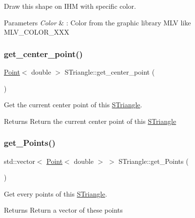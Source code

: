 Draw this shape on I\+HM with specific color. 


\begin{DoxyParams}{Parameters}
{\em Color} & \+: Color from the graphic library M\+LV like M\+L\+V\+\_\+\+C\+O\+L\+O\+R\+\_\+\+X\+XX \\
\hline
\end{DoxyParams}
\mbox{\label{classSTriangle_a61228a7f80ee90de80dff8c4e046f51f}} 
\subsubsection{\texorpdfstring{get\+\_\+center\+\_\+point()}{get\_center\_point()}}
{\footnotesize\ttfamily \hyperlink{classPoint}{Point}$<$ double $>$ S\+Triangle\+::get\+\_\+center\+\_\+point (\begin{DoxyParamCaption}{ }\end{DoxyParamCaption})}



Get the current center point of this \hyperlink{classSTriangle}{S\+Triangle}. 

\begin{DoxyReturn}{Returns}
Return the current center point of this \hyperlink{classSTriangle}{S\+Triangle} 
\end{DoxyReturn}
\mbox{\label{classSTriangle_a29c749d55e14efff0436e490bcd50386}} 
\subsubsection{\texorpdfstring{get\+\_\+\+Points()}{get\_Points()}}
{\footnotesize\ttfamily std\+::vector$<$ \hyperlink{classPoint}{Point}$<$ double $>$ $>$ S\+Triangle\+::get\+\_\+\+Points (\begin{DoxyParamCaption}{ }\end{DoxyParamCaption})}



Get every points of this \hyperlink{classSTriangle}{S\+Triangle}. 

\begin{DoxyReturn}{Returns}
Return a vector of these points 
\end{DoxyReturn}
\mbox{\label{classSTriangle_a122eba5ec56c5f1707d53aea5be0b69c}} 
